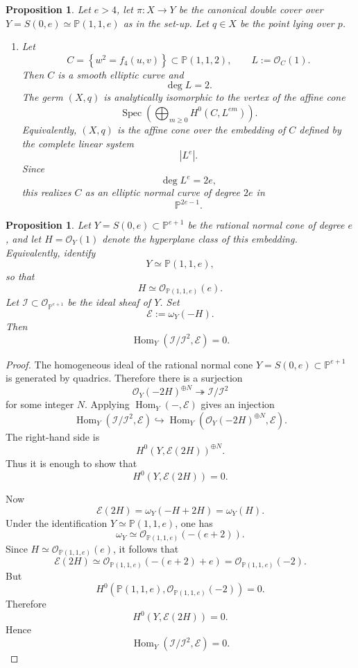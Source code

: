 \documentclass[11pt,twoside]{amsart}
\theoremstyle{plain}
\numberwithin{equation}{section}
\newtheorem{proposition}[theorem]{Proposition}
\theoremstyle{definition}
\begin{document}
\begin{proposition}
Let $e>4$, let $\pi:X\longrightarrow Y$
be the canonical double cover over $Y=S(0,e)\simeq \mathbb{P}(1,1,e)$ as in the set-up. Let $q\in X$ be the point lying over $p$.
\begin{enumerate}
    \item Let
    $$
    C
    =
    \left\{
    w^2=f_4(u,v)
    \right\}
    \subset
    \mathbb{P}(1,1,2),
    \qquad
    L:=\mathcal{O}_C(1).
    $$
    Then $C$ is a smooth elliptic curve and
    $$
    \deg L=2.
    $$
    The germ $(X,q)$ is analytically isomorphic to the vertex of the affine cone
    $$
    \operatorname{Spec}
    \left(
    \bigoplus_{m\geq 0}
    H^0(C,L^{em})
    \right).
    $$
    Equivalently, $(X,q)$ is the affine cone over the embedding of $C$ defined by the complete linear system
    $$
    |L^e|.
    $$
    Since
    $$
    \deg L^e=2e,
    $$
    this realizes $C$ as an elliptic normal curve of degree $2e$ in
    $$
    \mathbb{P}^{2e-1}.
    $$

    
\end{enumerate}
\end{proposition}




\begin{proposition}\label{prop:hom-conormal-trace-zero-cone}
Let $Y=S(0,e)\subset\mathbb{P}^{e+1}$ be the rational normal cone of degree $e$, and let $H=\mathcal{O}_Y(1)$ denote the hyperplane class of this embedding. Equivalently, identify
$$
Y\simeq \mathbb{P}(1,1,e),
$$
so that
$$
H\simeq \mathcal{O}_{\mathbb{P}(1,1,e)}(e).
$$
Let $\mathcal{I}\subset\mathcal{O}_{\mathbb{P}^{e+1}}$ be the ideal sheaf of $Y$. Set
$$
\mathcal{E}:=\omega_Y(-H).
$$
Then
$$
\operatorname{Hom}_Y(\mathcal{I}/\mathcal{I}^2,\mathcal{E})=0.
$$
\end{proposition}

\begin{proof}
The homogeneous ideal of the rational normal cone $Y=S(0,e)\subset\mathbb{P}^{e+1}$ is generated by quadrics. Therefore there is a surjection
$$
\mathcal{O}_Y(-2H)^{\oplus N}\twoheadrightarrow \mathcal{I}/\mathcal{I}^2
$$
for some integer $N$. Applying $\operatorname{Hom}_Y(-,\mathcal{E})$ gives an injection
$$
\operatorname{Hom}_Y(\mathcal{I}/\mathcal{I}^2,\mathcal{E})
\hookrightarrow
\operatorname{Hom}_Y(\mathcal{O}_Y(-2H)^{\oplus N},\mathcal{E}).
$$
The right-hand side is
$$
H^0(Y,\mathcal{E}(2H))^{\oplus N}.
$$
Thus it is enough to show that
$$
H^0(Y,\mathcal{E}(2H))=0.
$$

Now
$$
\mathcal{E}(2H)=\omega_Y(-H+2H)=\omega_Y(H).
$$
Under the identification $Y\simeq\mathbb{P}(1,1,e)$, one has
$$
\omega_Y\simeq\mathcal{O}_{\mathbb{P}(1,1,e)}(-(e+2)).
$$
Since $H\simeq\mathcal{O}_{\mathbb{P}(1,1,e)}(e)$, it follows that
$$
\mathcal{E}(2H)
\simeq
\mathcal{O}_{\mathbb{P}(1,1,e)}(-(e+2)+e)
= \mathcal{O}_{\mathbb{P}(1,1,e)}(-2).
$$
But
$$
H^0(\mathbb{P}(1,1,e),\mathcal{O}_{\mathbb{P}(1,1,e)}(-2))=0.
$$
Therefore
$$
H^0(Y,\mathcal{E}(2H))=0.
$$
Hence
$$
\operatorname{Hom}_Y(\mathcal{I}/\mathcal{I}^2,\mathcal{E})=0.
$$
\end{proof}
\end{document}
